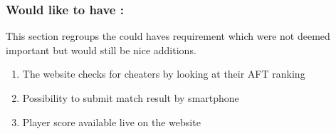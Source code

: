 \subsubsection{Would like to have :}
\label{Would like to have}

This section regroups the could haves requirement which were not deemed important
but would still be nice additions.\newline

\begin{enumerate} \itemsep1pt
\item \textcolor{green!60!black} {The website checks for cheaters by looking at their 
AFT ranking}
\item \textcolor{green!60!black} {Possibility to submit match result by smartphone}
\item \textcolor{green!60!black} {Player score available live on the website}
\end{enumerate}

